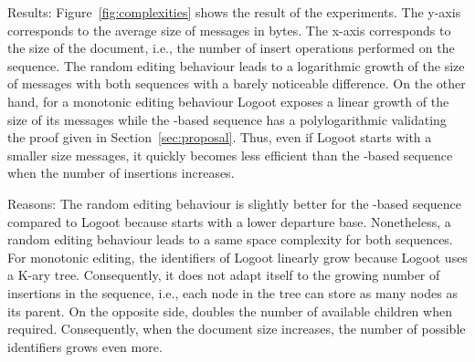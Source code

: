 \begin{asparadesc}
\item [Results:] Figure~\ref{fig:complexities} shows the result of the
  experiments. The y-axis corresponds to the average size of messages in
  bytes. The x-axis corresponds to the size of the document, i.e., the number
  of insert operations performed on the sequence. The random editing behaviour
  leads to a logarithmic growth of the size of messages with both sequences
  with a barely noticeable difference. On the other hand, for a monotonic
  editing behaviour Logoot exposes a linear growth of the size of its messages
  while the \NAME{}-based sequence has a polylogarithmic validating the proof
  given in Section~\ref{sec:proposal}. Thus, even if Logoot starts with a
  smaller size messages, it quickly becomes less efficient than the
  \NAME{}-based sequence when the number of insertions increases.

\item [Reasons:] The random editing behaviour is slightly better for the
  \NAME{}-based sequence compared to Logoot because \NAME{} starts with a lower
  departure base. Nonetheless, a random editing behaviour leads to a same space
  complexity for both sequences. For monotonic editing, the identifiers of
  Logoot linearly grow because Logoot uses a K-ary tree. Consequently, it does
  not adapt itself to the growing number of insertions in the sequence, i.e.,
  each node in the tree can store as many nodes as its parent. On the opposite
  side, \NAME{} doubles the number of available children when
  required. Consequently, when the document size increases, the number of
  possible identifiers grows even more.
\end{asparadesc}

\ \\

